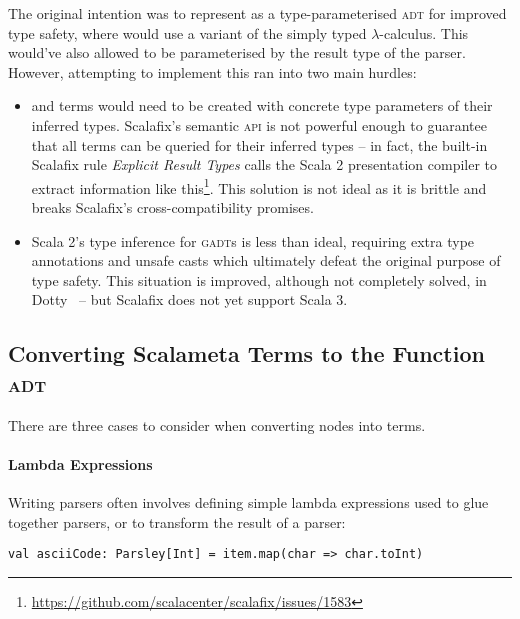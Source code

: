 \documentclass[../../main.tex]{subfiles}
\begin{document}
The original intention was to represent  as a type-parameterised \textsc{adt} for improved type safety, where  would use a variant of the simply typed $\lambda$-calculus.
This would've also allowed  to be parameterised by the result type of the parser.
However, attempting to implement this ran into two main hurdles:
\begin{itemize}
  \item {} and  terms would need to be created with concrete type parameters of their inferred types. Scalafix's semantic \textsc{api} is not powerful enough to guarantee that all terms can be queried for their inferred types -- in fact, the built-in Scalafix rule \emph{Explicit Result Types} calls the Scala 2 presentation compiler to extract information like this\footnote{\url{https://github.com/scalacenter/scalafix/issues/1583}}. This solution is not ideal as it is brittle and breaks Scalafix's cross-compatibility promises.
  \item Scala 2's type inference for \textsc{gadt}s is less than ideal, requiring extra type annotations and unsafe casts which ultimately defeat the original purpose of type safety. This situation is improved, although not completely solved, in Dotty~\cite{parreaux_towards_2019} -- but Scalafix does not yet support Scala 3.
\end{itemize}

\subsection{Converting Scalameta Terms to the Function \textsc{adt}}
There are three cases to consider when converting  nodes into  terms.

\paragraph{Lambda Expressions}
Writing parsers often involves defining simple lambda expressions used to glue together parsers, or to transform the result of a parser:
\begin{verbatim}
val asciiCode: Parsley[Int] = item.map(char => char.toInt)
\end{verbatim}
\end{document}

